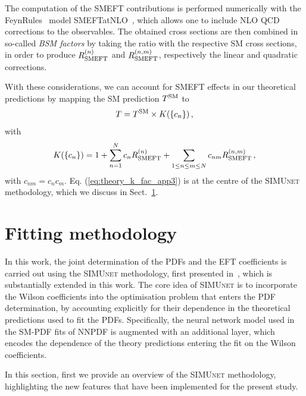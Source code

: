 \documentclass[withindex,glossary]{cam-thesis}
\newcommand{\simunet}{\textsc{SIMUnet}}
\begin{document}
The computation of the SMEFT contributions is
performed numerically with the FeynRules~\cite{Alloul:2013bka} model SMEFTatNLO~\cite{Degrande:2020evl}, which allows one to include NLO QCD corrections to the observables. The obtained cross sections are then combined in so-called \textit{BSM factors} by taking the ratio with the respective SM cross sections, in order to 
produce $R_{\rm SMEFT}^{(n)}$ and $R_{\rm SMEFT}^{(n,m)}$, respectively the linear and quadratic corrections.

With these considerations, we can account for SMEFT effects in our theoretical predictions
by mapping the SM prediction $T^{\rm SM}$ to 
%
\begin{equation}
\label{eq:theory_k_fac_app3}
 T = T^{\rm SM} \times  K(\{c_n\})\, , 
\end{equation}
%
with 
%
\begin{equation}
\label{eq:theory_k_fac}
    K(\{c_n\}) = 1+\sum_{n=1}^{N} c_n R_{\rm SMEFT}^{(n)}
    +\sum_{1 \leq n \leq m \leq N} c_{nm} R_{\rm SMEFT}^{(n,m)} \, ,
\end{equation}
%
with $c_{nm} = c_n c_m$. Eq. (\ref{eq:theory_k_fac_app3}) is at the centre of the \simunet{} methodology, which we discuss in Sect.~\ref{sec:methodology}. 


\newpage
\section{Fitting methodology}
\label{sec:methodology}

In this work, the joint determination of the PDFs and the EFT coefficients is
carried out using the \simunet{} methodology, first presented
in~\cite{Iranipour:2022iak}, which is substantially extended in this work.
%
The core idea of  \simunet{}  is to incorporate the Wilson coefficients into the optimisation problem
that enters the PDF determination, by accounting explicitly for their dependence
in the theoretical predictions used to fit the PDFs.
%
Specifically, the neural network model used in the SM-PDF fits of NNPDF is
augmented with an additional layer, which encodes the dependence of the theory
predictions entering the fit on the Wilson coefficients.

In this section, first we provide an overview of the \simunet{}
methodology, highlighting the new features that have been implemented
for the present study.
%
\end{document}
